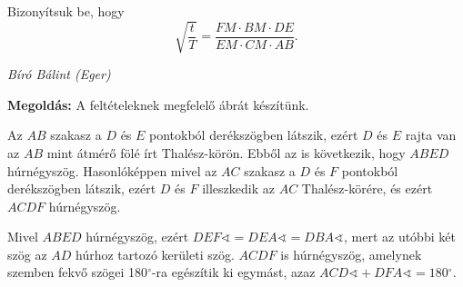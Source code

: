 \documentclass[a4paper,10pt]{article}
\newcommand{\ki}[2]{\hfill {\it #1 (#2)}\medskip}
\newcommand{\degre}{\ensuremath{^\circ}}
\begin{document}
Bizonyítsuk be, hogy
\[\sqrt{\frac t T} = \frac{FM \cdot BM \cdot DE}{EM \cdot CM \cdot AB}.\]

\ki{Bíró Bálint}{Eger}\medskip

{\bf Megoldás: } A feltételeknek megfelelő ábrát készítünk.

Az $AB$ szakasz a $D$ és $E$ pontokból derékszögben látszik, ezért $D$ és $E$ rajta van az $AB$ mint átmérő fölé írt Thalész-körön. Ebből az is következik, hogy $ABED$ húrnégyszög.
Hasonlóképpen mivel az $AC$ szakasz a $D$ és $F$ pontokból derékszögben látszik, ezért $D$
és $F$ illeszkedik az $AC$ Thalész-körére, és ezért $ACDF$ húrnégyszög.

Mivel $ABED$ húrnégyszög, ezért $DEF\sphericalangle = DEA\sphericalangle = DBA\sphericalangle$, mert az utóbbi két szög az $AD$ húrhoz tartozó kerületi szög. $ACDF$ is húrnégyszög, amelynek szemben fekvő szögei 180\degre-ra egészítik ki egymást, azaz $ACD\sphericalangle+ DFA\sphericalangle = 180\degre$.
\end{document}
